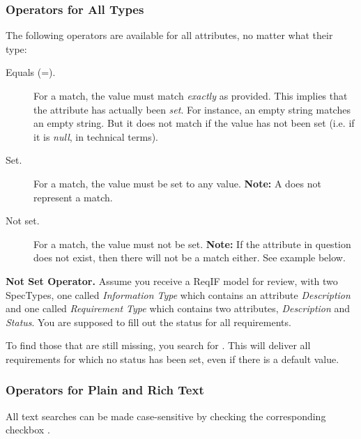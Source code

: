 \subsubsection{Operators for All Types}

The following operators are available for all attributes, no matter what their type:

\begin{description}
\item[Equals (=).] For a match, the value must match \textit{exactly} as provided.  This implies that the attribute has actually been \textit{set}.  For instance, an empty string matches an empty string.  But it does not match if the value has not been set (i.e. if it is \textit{null}, in technical terms).
\item[Set.] For a match, the value must be set to any value. \textbf{Note:} A  does not represent a match.
\item[Not set.] For a match, the value must not be set. \textbf{Note:} If the attribute in question does not exist, then there will not be a match either.  See example below.
\end{description}

\begin{example}
\textbf{Not Set Operator.}
Assume you receive a ReqIF model for review, with two SpecTypes, one called \textit{Information Type} which contains an attribute \textit{Description} and one called \textit{Requirement Type} which contains two attributes, \textit{Description} and \textit{Status}.  You are supposed to fill out the status for all requirements.

To find those that are still missing, you search for  .  This will deliver all requirements for which no status has been set, even if there is a default value.
\end{example}

\subsubsection{Operators for Plain and Rich Text}

All text searches can be made case-sensitive by checking the corresponding checkbox .

